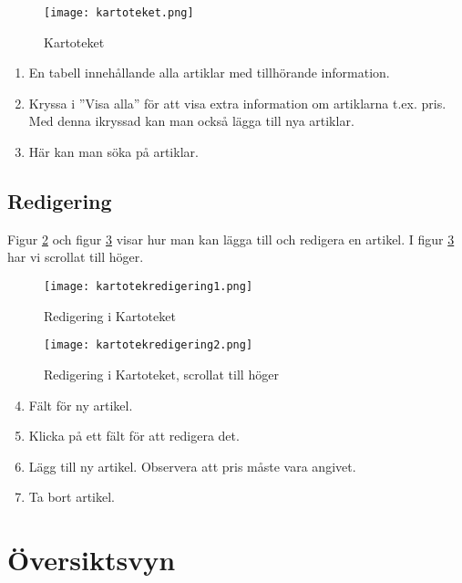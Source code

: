 \documentclass[12pt]{amsart}
\begin{document}
  \begin{figure}[H]
	\begin{center}
	\texttt{[image: kartoteket.png]}
	\caption{Kartoteket}
	\label{fig:kartoteket}
	\end{center}
\end{figure}

\begin{enumerate}
\item En tabell innehållande alla artiklar med tillhörande information.
\item Kryssa i ''Visa alla'' för att visa extra information om artiklarna t.ex. pris. Med denna ikryssad kan man också lägga till nya artiklar.
\item Här kan man söka på artiklar.
\end{enumerate}
\subsection{Redigering}
Figur \ref{fig:kartotekredigering1} och figur \ref{fig:kartotekredigering2} visar hur man kan lägga till och redigera en artikel. I figur \ref{fig:kartotekredigering2} har vi scrollat till höger.

 \begin{figure}[H]
	\begin{center}
	\texttt{[image: kartotekredigering1.png]}
	\caption{Redigering i Kartoteket}
	\label{fig:kartotekredigering1}
	\end{center}
\end{figure}

 \begin{figure}[H]
	\begin{center}
	\texttt{[image: kartotekredigering2.png]}
	\caption{Redigering i Kartoteket, scrollat till höger}
	\label{fig:kartotekredigering2}
	\end{center}
\end{figure}

\begin{enumerate}
  \setcounter{enumi}{3}
  \item Fält för ny artikel. 
  \item Klicka på ett fält för att redigera det.
  \item Lägg till ny artikel. Observera att pris måste vara angivet.
  \item Ta bort artikel.
\end{enumerate}

\section{Översiktsvyn}
\end{document}
